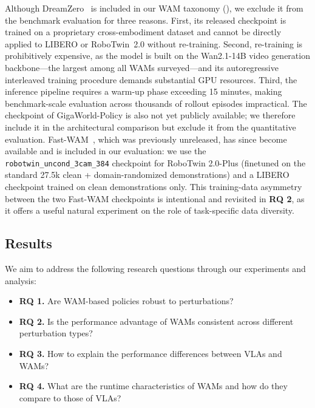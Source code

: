 \documentclass{article}
\begin{document}
Although DreamZero~\citep{ye2026dreamzero} is included in our WAM taxonomy (), we exclude it from the benchmark evaluation for three reasons. First, its released checkpoint is trained on a proprietary cross-embodiment dataset and cannot be directly applied to LIBERO or RoboTwin~2.0 without re-training. Second, re-training is prohibitively expensive, as the model is built on the Wan2.1-14B video generation backbone---the largest among all WAMs surveyed---and its autoregressive interleaved training procedure demands substantial GPU resources. Third, the inference pipeline requires a warm-up phase exceeding 15 minutes, making benchmark-scale evaluation across thousands of rollout episodes impractical. The checkpoint of GigaWorld-Policy is also not yet publicly available; we therefore include it in the architectural comparison but exclude it from the quantitative evaluation. Fast-WAM~\citep{yuan2026fast}, which was previously unreleased, has since become available and is included in our evaluation: we use the \texttt{robotwin\_uncond\_3cam\_384} checkpoint for RoboTwin 2.0-Plus (finetuned on the standard 27.5k clean + domain-randomized demonstrations) and a LIBERO checkpoint trained on clean demonstrations only. This training-data asymmetry between the two Fast-WAM checkpoints is intentional and revisited in \textbf{RQ 2}, as it offers a useful natural experiment on the role of task-specific data diversity.

\subsection{Results}

We aim to address the following research questions through our experiments and analysis: 
\begin{itemize}
    \item \textbf{RQ 1.} Are WAM-based policies robust to perturbations? 

    \item 
\textbf{RQ 2.} Is the performance advantage of WAMs consistent across different perturbation types? 

    \item 
\textbf{RQ 3.} How to explain the performance differences between VLAs and WAMs? 

\item \textbf{RQ 4.} What are the runtime characteristics of WAMs and how do they compare to those of VLAs?  
\end{itemize}
\end{document}
